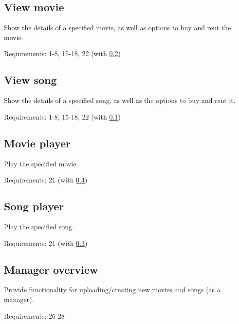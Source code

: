 \subsection{View movie}
\label{app:client-views-view-movie}
Show the details of a specified movie, as well as options to buy and rent the movie.

Requirements: 1-8, 15-18, 22 (with \ref{app:client-views-view-song})

\subsection{View song}
\label{app:client-views-view-song}
Show the details of a specified song, as well as the options to buy and rent it.

Requirements: 1-8, 15-18, 22 (with \ref{app:client-views-view-movie})

\subsection{Movie player}
\label{app:client-views-movie-player}
Play the specified movie.

Requirements:  21 (with \ref{app:client-views-song-player})

\subsection{Song player}
\label{app:client-views-song-player}
Play the specified song.

Requirements: 21 (with \ref{app:client-views-movie-player})

\subsection{Manager overview}
Provide functionality for uploading/creating new movies and songs (as a manager).

Requirements: 26-28

